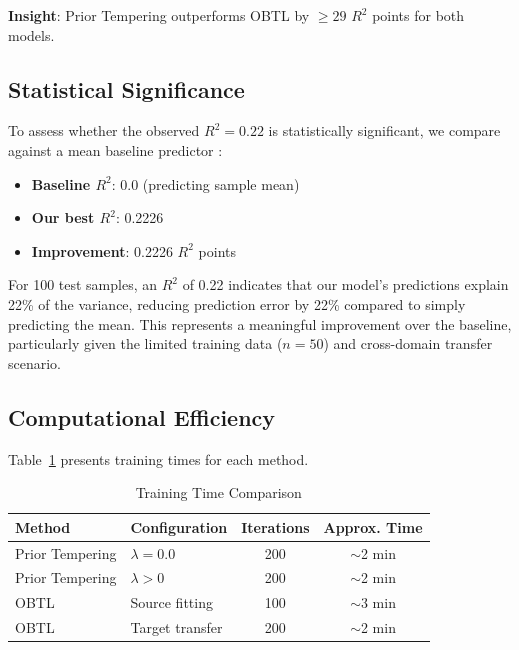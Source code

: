 \textbf{Insight}: Prior Tempering outperforms OBTL by \(\geq 29\) \(R^2\) points for both models.

\subsection{Statistical Significance}
\label{sec:statistical_significance}

To assess whether the observed \(R^2=0.22\) is statistically significant, we compare against a mean baseline predictor \citet{hastie2009elements}:

\begin{itemize}
    \item \textbf{Baseline \(R^2\)}: 0.0 (predicting sample mean)
    \item \textbf{Our best \(R^2\)}: 0.2226
    \item \textbf{Improvement}: 0.2226 \(R^2\) points
\end{itemize}

For 100 test samples, an \(R^2\) of 0.22 indicates that our model's predictions explain 22\% of the variance, reducing prediction error by 22\% compared to simply predicting the mean. This represents a meaningful improvement over the baseline, particularly given the limited training data (\(n=50\)) and cross-domain transfer scenario.

\subsection{Computational Efficiency}
\label{sec:computational_efficiency}

Table~\ref{tab:training_time} presents training times for each method.

\begin{table}[htbp]
\centering
\caption{Training Time Comparison}
\label{tab:training_time}
\begin{tabular}{llcc}
\toprule
Method & Configuration & Iterations & Approx. Time \\
\midrule
Prior Tempering & \(\lambda=0.0\) & 200 & \(\sim\)2 min \\
Prior Tempering & \(\lambda>0\) & 200 & \(\sim\)2 min \\
OBTL & Source fitting & 100 & \(\sim\)3 min \\
OBTL & Target transfer & 200 & \(\sim\)2 min \\
\bottomrule
\end{tabular}
\end{table}

